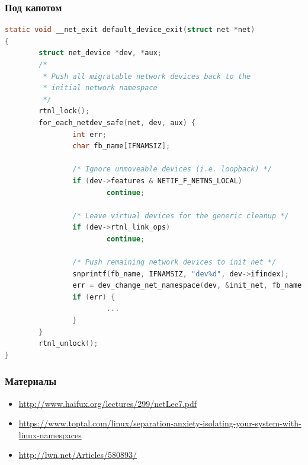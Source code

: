 \begin{frame}[fragile, label={}]
\frametitle{Под капотом}
\begin{block}{}
    \begin{lstlisting}[language=c, basicstyle={\fontsize{6}{6}\ttfamily}]
static void __net_exit default_device_exit(struct net *net)
{
        struct net_device *dev, *aux;
        /*
         * Push all migratable network devices back to the
         * initial network namespace
         */
        rtnl_lock();
        for_each_netdev_safe(net, dev, aux) {
                int err;
                char fb_name[IFNAMSIZ];

                /* Ignore unmoveable devices (i.e. loopback) */
                if (dev->features & NETIF_F_NETNS_LOCAL)
                        continue;

                /* Leave virtual devices for the generic cleanup */
                if (dev->rtnl_link_ops)
                        continue;

                /* Push remaining network devices to init_net */
                snprintf(fb_name, IFNAMSIZ, "dev%d", dev->ifindex);
                err = dev_change_net_namespace(dev, &init_net, fb_name);
                if (err) {
                        ...
                }
        }
        rtnl_unlock();
}
\end{lstlisting}
\end{block}
\end{frame}


\begin{frame}
\frametitle{Материалы}
    \begin{itemize}
        \item \href{http://www.haifux.org/lectures/299/netLec7.pdf}{http://www.haifux.org/lectures/299/netLec7.pdf}
        \item \href{https://www.toptal.com/linux/separation-anxiety-isolating-your-system-with-linux-namespaces}{https://www.toptal.com/linux/separation-anxiety-isolating-your-system-with-linux-namespaces}
        \item \href{http://lwn.net/Articles/580893/}{http://lwn.net/Articles/580893/}
    \end{itemize}
\end{frame}


